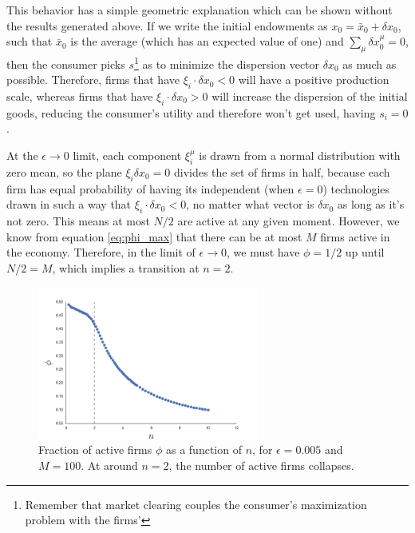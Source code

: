 This behavior has a simple geometric explanation which can be shown without the results generated above. If we write the initial endowments as $x_0 = \bar{x}_0 + \delta x_0$, such that $\bar{x}_0$ is the average (which has an expected value of one) and $\sum_\mu \delta x_0^\mu = 0$, then the consumer picks $s$\footnote{Remember that market clearing couples the consumer's maximization problem with the firms'} as to minimize the dispersion vector $\delta x_0$ as much as possible. Therefore, firms that have $\xi_i \cdot \delta x_0 < 0$ will have a positive production scale, whereas firms that have $\xi_i \cdot \delta x_0 > 0$ will increase the dispersion of the initial goods, reducing the consumer's utility and therefore won't get used, having $s_i = 0$.

At the $\epsilon \to 0$ limit, each component $\xi_i^\mu$ is drawn from a normal distribution with zero mean, so the plane $\xi_i \delta x_0 = 0$ divides the set of firms in half, because each firm has equal probability of having its independent (when $\epsilon = 0$) technologies drawn in such a way that $\xi_i \cdot \delta x_0 < 0$, no matter what vector is $\delta x_0$ as long as it's not zero. This means at most $N/2$ are active at any given moment. However, we know from equation \eqref{eq:phi_max} that there can be at most $M$ firms active in the economy. Therefore, in the limit of $\epsilon \to 0$, we must have $\phi = 1/2$ up until $N/2 = M$, which implies a transition at $n = 2$.

\begin{figure}[!ht]
  \centering
  \includegraphics[width=0.65\textwidth]{figs_rle/s_pos.png}
  \caption{Fraction of active firms $\phi$ as a function of $n$, for $\epsilon = 0.005$ and $M=100$. At around $n=2$, the number of active firms collapses.}
  \label{fig:spos}
\end{figure}


